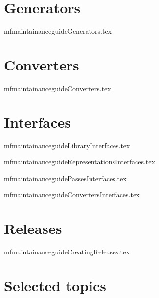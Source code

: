 \documentclass[11pt,a4paper]{report}
\begin{document}
\part{Generators}

{mfmaintainanceguideGenerators.tex}


\part{Converters}

{mfmaintainanceguideConverters.tex}


\part{Interfaces}

{mfmaintainanceguideLibraryInterfaces.tex}

{mfmaintainanceguideRepresentationsInterfaces.tex}

{mfmaintainanceguidePassesInterfaces.tex}

{mfmaintainanceguideConvertersInterfaces.tex}


\part{Releases}

{mfmaintainanceguideCreatingReleases.tex}


\part{Selected topics}

\end{document}
